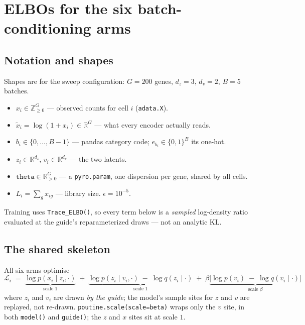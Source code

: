 \documentclass[11pt]{article}
\newcommand{\thetapar}{\texttt{theta}}
\begin{document}
\section*{ELBOs for the six batch-conditioning arms}

\subsection*{Notation and shapes}

Shapes are for the sweep configuration: $G=200$ genes, $d_z=3$, $d_v=2$, $B=5$ batches.

\begin{itemize}\itemsep2pt
\item $x_i \in \mathbb{Z}_{\geq 0}^{G}$ --- observed counts for cell $i$ (\texttt{adata.X}).
\item $\tilde{x}_i = \log(1 + x_i) \in \mathbb{R}^{G}$ --- what every encoder actually reads.
\item $b_i \in \{0,\dots,B-1\}$ --- pandas category code; $e_{b_i} \in \{0,1\}^{B}$ its one-hot.
\item $z_i \in \mathbb{R}^{d_z}$, $v_i \in \mathbb{R}^{d_v}$ --- the two latents.
\item $\thetapar \in \mathbb{R}_{>0}^{G}$ --- a \texttt{pyro.param}, one dispersion per gene, shared by all cells.
\item $L_i = \sum_{g} x_{ig}$ --- library size. $\epsilon = 10^{-5}$.
\end{itemize}

Training uses \texttt{Trace\_ELBO()}, so every term below is a \emph{sampled} log-density
ratio evaluated at the guide's reparameterized draws --- not an analytic KL.

\subsection*{The shared skeleton}

All six arms optimise
\begin{equation}
\mathcal{L}_i \;=\;
\underbrace{\log p(x_i \mid z_i, \cdot)}_{\text{scale } 1}
\;+\;
\underbrace{\log p(z_i \mid v_i, \cdot) \;-\; \log q(z_i \mid \cdot)}_{\text{scale } 1}
\;+\;
\beta \underbrace{\Big[\log p(v_i) \;-\; \log q(v_i \mid \cdot)\Big]}_{\text{scale } \beta}
\label{eq:skeleton}
\end{equation}
where $z_i$ and $v_i$ are drawn \emph{by the guide}; the model's sample sites for $z$ and $v$
are replayed, not re-drawn. \texttt{poutine.scale(scale=beta)} wraps only the $v$ site, in
both \texttt{model()} and \texttt{guide()}; the $z$ and $x$ sites sit at scale $1$.
\end{document}
